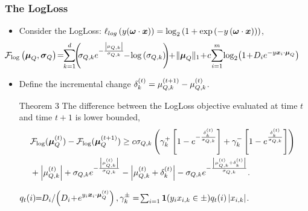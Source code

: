 \documentclass[mathserif]{beamer}
\begin{document}
\begin{frame}
\frametitle{ The LogLoss  }
\vspace{-0.1cm}
\begin{itemize}
\item Consider the LogLoss: $\ell_{log}\left({y ({\boldsymbol{\omega}} \cdot {\boldsymbol{x}})}\right) = \log_2{\left({
    1+\exp{\left({-y \left({ {\boldsymbol{\omega}}\cdot {\boldsymbol{x}}}\right) }\right) } }\right)}$,
\begin{align*}
\!\!\!\!\!\!\!\!\!\!\!\F_{\log} &\paren{\vmuq,\vsigmaq}\!=\!\!
\sum_{k=1}^{d}\!\! \paren{\!\!\sigmaqi{k}e^{-\frac{\abs{\muqi{k}}}{\sigmaqi{k}}}\!\!-\!\log{ \paren{
      \sigmaqi{k} } } \!\!}\!\!+\!\Vert \vmuq
\Vert_1\!+\! c\!\sum_{i =1}^m \! \log_2\!\paren{1\!+\!D_i e^{- y  \vxii \cdot \vmuq}}
\end{align*}
\item Define the incremental change $\delta_k ^{(t)} =
\mu_{Q,k}^{(t+1)}-\mu_{Q,k}^{(t)}$.
\vspace{-0.15cm}
\begin{block}{Theorem 3} 
The 
difference between
the LogLoss objective %
evaluated at time $t$ and time $t+1$ is lower bounded,
\vspace{-0.6cm}
\begin{align*}
&{\mathcal{F}}_{\log}({\boldsymbol{\mu}}_Q^{(t)})
-{\mathcal{F}}_{\log}({\boldsymbol{\mu}}_Q^{(t+1)}) \geq  c\sigma_{Q,k} \left({\gamma_k^{+}\left[{1-e^{-\frac{\delta_k ^{(t)}}{\sigma_{Q,k}}}}\right]+\gamma_k^{-}\left[{1-e^{\frac{\delta_k ^{(t)}}{\sigma_{Q,k}}}}\right]}\right)  ~
 \\  &  +\left\vert{\mu_{Q,k}^{(t)} }\right\vert+\sigma_{Q,k} e^{-\frac{\left\vert{\mu_{Q,k}^{(t)}
      }\right\vert}{\sigma_{Q,k}}}-\left\vert{\mu_{Q,k}^{(t)} +\delta_k^{(t)}
  }\right\vert-\sigma_{Q,k} e^{-\frac{\left\vert{\mu_{Q,k}^{(t)} +\delta_k^{(t)}
      }\right\vert}{\sigma_{Q,k}}}.
\end{align*}

%
\vspace{-0.2cm}
  $q_t(i)\!\! =\!\! {D_i}/\!\paren{D_i\!+\!e^{\yii  \vxii \cdot \vmuq^{(t)} }},\gamma_k^{\pm} =\! \sum_{i=1}\mb{1}(\yii x_{i,k}\in\pm)q_t(i)\abs{x_{i,k}}$.
\vspace{-0.1cm}
\end{block} 
\end{itemize}
\end{frame}
\end{document}
